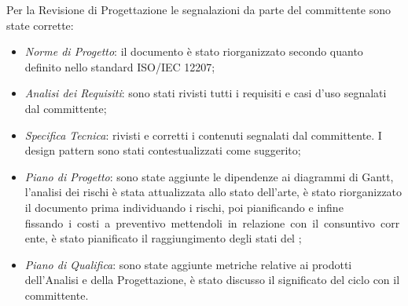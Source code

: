 		Per la Revisione di Progettazione le segnalazioni da parte del committente sono state corrette:
		
		\begin{itemize}
			\item \emph{Norme di Progetto}: il documento è stato riorganizzato secondo quanto definito nello standard ISO/IEC 12207;
			\item \emph{Analisi dei Requisiti}: sono stati rivisti tutti i requisiti e casi d'uso segnalati dal committente;
			\item \emph{Specifica Tecnica}: rivisti e corretti i contenuti segnalati dal committente. I design pattern sono stati contestualizzati come suggerito;
			\item \emph{Piano di Progetto}: sono state aggiunte le dipendenze ai diagrammi di Gantt, l'analisi dei rischi è stata attualizzata allo stato dell'arte, è stato riorganizzato il documento prima individuando i rischi, poi pianificando e infine fissando i costi a preventivo mettendoli in relazione con il consuntivo corrente, è stato pianificato il raggiungimento degli stati del ;
			\item \emph{Piano di Qualifica}: sono state aggiunte metriche relative ai prodotti dell'Analisi e della Progettazione, è stato discusso il significato del ciclo  con il committente.
		\end{itemize}

			


	
